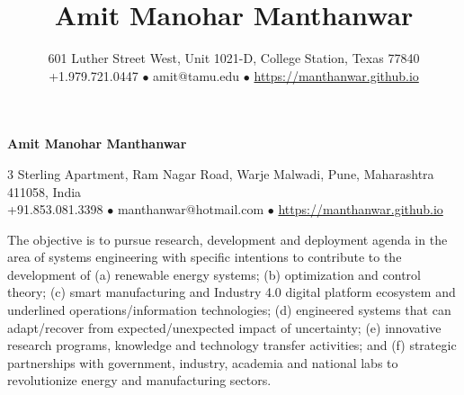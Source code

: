 \documentclass[10pt]{article}
\title{\vspace{-15mm}\huge{\textbf{Amit Manohar Manthanwar\\[-2mm]}}}
\author{
\small{601 Luther Street West, Unit 1021-D, College Station, Texas 77840 }\\[0mm]
\small{+1.979.721.0447 \;\;$\bullet$\;\; amit@tamu.edu \;\;$\bullet$\;\; \href{https://manthanwar.github.io}{https://manthanwar.github.io}}}
\date{}%
\newcommand{\parSpacing}{5pt}
\begin{document}
\pagestyle{fancy}

\begin{center}
\huge{\textbf{Amit Manohar Manthanwar\\[2mm]}}

\small{3 Sterling Apartment, Ram Nagar Road, Warje Malwadi, Pune, Maharashtra 411058, India}\\[2mm]
\small{+91.853.081.3398 \;\;$\bullet$\;\; manthanwar@hotmail.com \;\;$\bullet$\;\; \href{https://manthanwar.github.io}{https://manthanwar.github.io}}

\end{center}
\bigskip

The objective is to pursue research, development and deployment agenda in the area of systems engineering with specific intentions to contribute to the development of (a) renewable energy systems; (b) optimization and control theory; (c) smart manufacturing and Industry 4.0 digital platform ecosystem and underlined operations/information technologies; (d) engineered systems that can adapt/recover from expected/unexpected impact of uncertainty; (e) innovative research programs, knowledge and technology transfer activities; and (f) strategic partnerships with government, industry, academia and national labs to revolutionize energy and manufacturing sectors.
\end{document}
